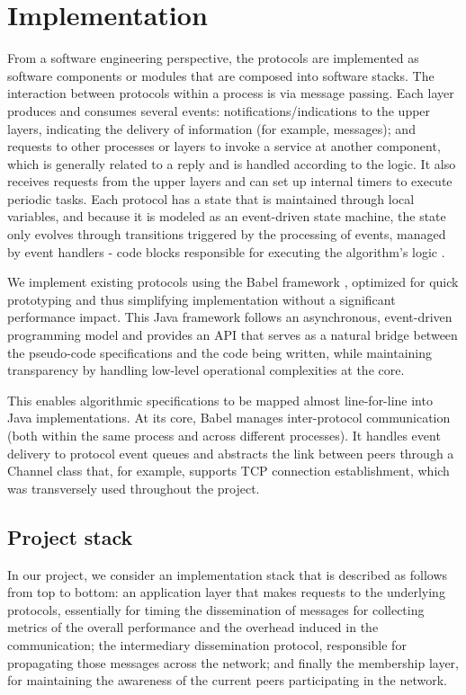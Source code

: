 \documentclass[sigconf,a4paper]{acmart}
\begin{document}
\section{Implementation}

From a software engineering perspective, the protocols are implemented as software components or modules 
that are composed into software stacks. The interaction between protocols within a process is via message 
passing. Each layer produces and consumes several events: notifications/indications to the upper layers, 
indicating the delivery of information (for example, messages); and requests to other processes or layers 
to invoke a service at another component, which is generally related to a reply and is handled according 
to the logic. It also receives requests from the upper layers and can set up internal timers to execute 
periodic tasks. Each protocol has a state that is maintained through local variables, and because it is modeled 
as an event-driven state machine, the state only evolves through transitions triggered by the processing of events, 
managed by event handlers - code blocks responsible for executing the algorithm's logic \cite{introduction-to-reliable-and-secure-distributed-programming}.

We implement existing protocols using the Babel framework \cite{babel_framework}, optimized for quick prototyping and thus 
simplifying implementation without a significant performance impact. This Java framework follows an asynchronous, 
event-driven programming model and provides an API that serves as a natural bridge between the pseudo-code 
specifications and the code being written, while maintaining transparency by handling low-level operational 
complexities at the core.

This enables algorithmic specifications to be mapped almost line-for-line into Java implementations. 
At its core, Babel manages inter-protocol communication (both within the same process and across different processes). 
It handles event delivery to protocol event queues and abstracts the link between peers through a Channel class that, for example, 
supports TCP connection establishment, which was transversely used throughout the project.

\subsection{Project stack}

In our project, we consider an implementation stack that is described as follows from top to bottom: 
an application layer that makes requests to the underlying protocols, essentially for timing the dissemination 
of messages for collecting metrics of the overall performance and the overhead induced in the communication; 
the intermediary dissemination protocol, responsible for propagating those messages across the network; and 
finally the membership layer, for maintaining the awareness of the current peers participating in the network.
\end{document}
